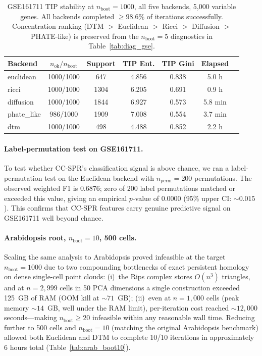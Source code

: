 \documentclass[11pt]{article}
\begin{document}
\begin{table}[h]
\centering
\small
\begin{tabular}{lcccccc}
\toprule
Backend & $n_{\text{ok}}/n_{\text{boot}}$ & Support & TIP Ent. & TIP Gini & Elapsed \\
\midrule
euclidean  & 1000/1000 & 647  & 4.856 & 0.838 & 5.0 h \\
ricci      & 1000/1000 & 1304 & 6.205 & 0.691 & 0.9 h \\
diffusion  & 1000/1000 & 1844 & 6.927 & 0.573 & 5.8 min \\
phate\_like & 986/1000 & 1909 & 7.008 & 0.554 & 3.7 min \\
dtm        & 1000/1000 & 498  & 4.488 & 0.852 & 2.2 h \\
\bottomrule
\end{tabular}
\caption{GSE161711 TIP stability at $n_{\text{boot}} = 1000$, all five backends, 5{,}000 variable genes.
All backends completed $\geq 98.6\%$ of iterations successfully.
Concentration ranking (DTM $>$ Euclidean $>$ Ricci $>$ Diffusion $>$ PHATE-like) is preserved from the $n_{\text{boot}} = 5$ diagnostics in Table~\ref{tab:diag_gse}.}
\label{tab:gse_boot1000}
\end{table}

\paragraph{Label-permutation test on GSE161711.}
To test whether CC-SPR's classification signal is above chance, we ran a label-permutation test on the Euclidean backend with $n_{\text{perm}} = 200$ permutations.
The observed weighted F1 is $0.6876$; zero of 200 label permutations matched or exceeded this value, giving an empirical $p$-value of $0.0000$ (95\% upper CI: $\sim 0.015$).
This confirms that CC-SPR features carry genuine predictive signal on GSE161711 well beyond chance.

\paragraph{Arabidopsis root, $n_{\text{boot}} = 10$, 500 cells.}
Scaling the same analysis to Arabidopsis proved infeasible at the target $n_{\text{boot}} = 1000$ due to two compounding bottlenecks of exact persistent homology on dense single-cell point clouds:
(i)~the Rips complex stores $O(n^3)$ triangles, and at $n = 2{,}999$ cells in 50 PCA dimensions a single construction exceeded 125~GB of RAM (OOM kill at $\sim 71$~GB);
(ii)~even at $n = 1{,}000$ cells (peak memory $\sim 14$~GB, well under the RAM limit), per-iteration cost reached $\sim 12{,}000$ seconds---making $n_{\text{boot}} \geq 20$ infeasible within any reasonable wall time.
Reducing further to 500 cells and $n_{\text{boot}} = 10$ (matching the original Arabidopsis benchmark) allowed both Euclidean and DTM to complete 10/10 iterations in approximately 6 hours total (Table~\ref{tab:arab_boot10}).
\end{document}
